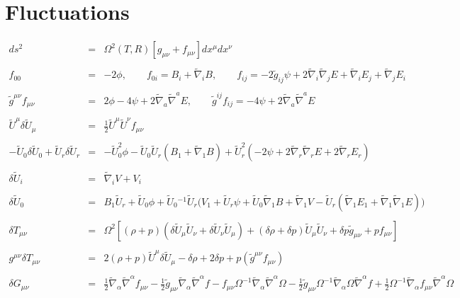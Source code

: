 \documentclass[10pt,letterpaper]{article}
\numberwithin{equation}{section}
\begin{document}
\section{Fluctuations}
\begin{eqnarray}
ds^2 &=& \Omega^2(T,R)\left[g_{\mu\nu}+ f_{\mu\nu}\right] dx^\mu dx^\nu
\\ \nonumber\\
f_{00} &=& -2\phi,\qquad f_{0i} = B_i +\tilde\nabla_i B,
\qquad
f_{ij} = -2 \tilde g_{ij} \psi + 2\tilde\nabla_i\tilde\nabla_j E+ \tilde\nabla_i E_j +\tilde\nabla_j E_i
\\ \nonumber\\
\tilde g^{\mu\nu} f_{\mu\nu} &=&2\phi -4\psi + 2\tilde\nabla_a\tilde\nabla^a E,\qquad
\tilde g^{ij}f_{ij} = -4\psi + 2\tilde\nabla_a\tilde\nabla^a E
\\ \nonumber\\
\tilde U^\mu \delta \tilde U_\mu &=& \tfrac12 \tilde U^\mu \tilde U^\nu f_{\mu\nu}
\\ \nonumber\\
-\tilde U_0 \delta \tilde U_0 + \tilde U_r \delta \tilde U_r &=& -\tilde U_0^2 \phi - \tilde U_0 \tilde U_r(B_1 + \tilde\nabla_1 B) + \tilde U_r^2(-2\psi+2\tilde\nabla_r\tilde\nabla_r E + 2\tilde\nabla_r E_r)
\\ \nonumber\\
\delta \tilde U_i &=& \tilde\nabla_i V + V_i
\\ \nonumber\\
\delta \tilde U_0 &=& B_{1} \tilde U_{r}{} + \tilde U_{0}{} \phi + \tilde U_{0}{}^{-1} \tilde U_{r}{} \bigl(V_{1} + \tilde U_{r}{} \psi + \tilde U_{0}{} \tilde{\nabla}_{1}B + \tilde{\nabla}_{1}V -  \tilde U_{r}{} (\tilde{\nabla}_{1}E_{1} + \tilde{\nabla}_{1}\tilde{\nabla}_{1}E)\bigr)
\\ \nonumber\\
\delta T_{\mu\nu}&=& \Omega^2 \left[ (\rho+p)(\delta \tilde U_\mu \tilde U_\nu + \delta \tilde U_\nu \tilde U_\mu)+ (\delta \rho + \delta p)\tilde U_\mu \tilde U_\nu + \delta p \tilde g_{\mu\nu} + p f_{\mu\nu}\right]
\\  \nonumber\\ 
g^{\mu\nu}\delta T_{\mu\nu}&=& 2(\rho+p) \tilde U^\mu \delta  \tilde U_\mu -\delta \rho +2\delta p +p(\tilde g^{\mu\nu}f_{\mu\nu}) 
\\ \nonumber \\ 
\delta G_{\mu\nu}&=& \tfrac{1}{2} \tilde{\nabla}_{\alpha }\tilde{\nabla}^{\alpha }f_{\mu \nu } -  \tfrac{1}{2} \tilde{g}_{\mu \nu } \tilde{\nabla}_{\alpha }\tilde{\nabla}^{\alpha }f -  f_{\mu \nu } \Omega^{-1} \tilde{\nabla}_{\alpha }\tilde{\nabla}^{\alpha }\Omega -  \tfrac{1}{2} \tilde{g}_{\mu \nu } \Omega^{-1} \tilde{\nabla}_{\alpha }\Omega \tilde{\nabla}^{\alpha }f + \tfrac{1}{2} \Omega^{-1} \tilde{\nabla}_{\alpha }f_{\mu \nu } \tilde{\nabla}^{\alpha }\Omega \nonumber \\ 

\end{eqnarray}
\end{document}
